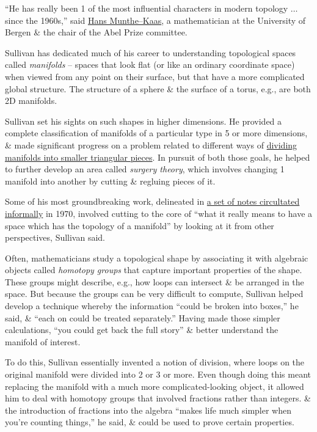 \documentclass[oneside]{book}
\numberwithin{equation}{section}
\begin{document}
``He has really been 1 of the most influential characters in modern topology $\ldots$ since the 1960s,'' said \href{http://hans.munthe-kaas.no/}{Hans Munthe--Kaas}, a mathematician at the University of Bergen \& the chair of the Abel Prize committee.

Sullivan has dedicated much of his career to understanding topological spaces called \textit{manifolds} -- spaces that look flat (or like an ordinary coordinate space) when viewed from any point on their surface, but that have a more complicated global structure. The structure of a sphere \& the surface of a torus, e.g., are both 2D manifolds.

Sullivan set his sights on such shapes in higher dimensions. He provided a complete classification of manifolds of a particular type in 5 or more dimensions, \& made significant progress on a problem related to different ways of \href{https://www.quantamagazine.org/triangulation-conjecture-disproved-20150113/}{dividing manifolds into smaller triangular pieces}. In pursuit of both those goals, he helped to further develop an area called \textit{surgery theory}, which involves changing 1 manifold into another by cutting \& regluing pieces of it.

Some of his most groundbreaking work, delineated in \href{https://www.maths.ed.ac.uk/~v1ranick/books/gtop.pdf}{a set of notes circultated informally} in 1970, involved cutting to the core of ``what it really means to have a space which has the topology of a manifold'' by looking at it from other perspectives, Sullivan said.

Often, mathematicians study a topological shape by associating it with algebraic objects called \textit{homotopy groups} that capture important properties of the shape. These groups might describe, e.g., how loops can intersect \& be arranged in the space. But because the groups can be very difficult to compute, Sullivan helped develop a technique whereby the information ``could be broken into boxes,'' he said, \& ``each on could be treated separately.'' Having made those simpler calculations, ``you could get back the full story'' \& better understand the manifold of interest.

To do this, Sullivan essentially invented a notion of division, where loops on the original manifold were divided into 2 or 3 or more. Even though doing this meant replacing the manifold with a much more complicated-looking object, it allowed him to deal with homotopy groups that involved fractions rather than integers. \& the introduction of fractions into the algebra ``makes life much simpler when you're counting things,'' he said, \& could be used to prove certain properties.
\end{document}

